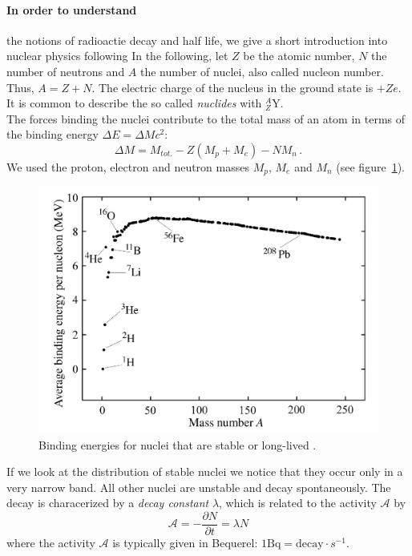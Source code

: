 \paragraph{In order to understand}
the notions of radioactie decay and half life, we
give a short introduction into nuclear physics following \cite{martin2006nuclear}
In the following, let $Z$ be the atomic number, $N$ the number of neutrons and $A$ the number of nuclei, also
called nucleon number. Thus, $A = Z + N$. The electric charge of the nucleus in the ground state is $+Z e$.
It is common to describe the so called \emph{nuclides} with $_{Z}^{A}\textrm{Y}$.\\
The forces binding the nuclei contribute to the total mass of an atom in terms of the 
binding energy $\Delta E = \Delta M c^2$:
\begin{equation}
\Delta M = M_{tot.} - Z(M_p + M_e) - N M_n \, .
\end{equation}
We used the proton, electron and neutron masses $M_p$, $M_e$ and $M_n$ 
(see figure~\ref{fig:bindingenergy}).
\begin{figure}[htpb]
    \centering
    \includegraphics[width=0.8\linewidth]{figures/bindingenergy}
    \caption{Binding energies for nuclei that are stable or long-lived \cite{Hooshyar}.}
    \label{fig:bindingenergy}
\end{figure}
If we look at the distribution of stable nuclei we notice
that they occur only in a very narrow band. All other nuclei are unstable and decay spontaneously.
The decay is characerized by a \emph{decay constant} $\lambda$, which is related to the activity $\mathcal{A}$
by 
\begin{equation}\label{eq:decay}
    \mathcal{A} = -\frac{\partial N}{\partial t} = \lambda N 
\end{equation}
where the activity $\mathcal{A}$ is typically given in Bequerel: $1 \textrm{Bq}= \textrm{decay}\cdot s^{-1}$.
